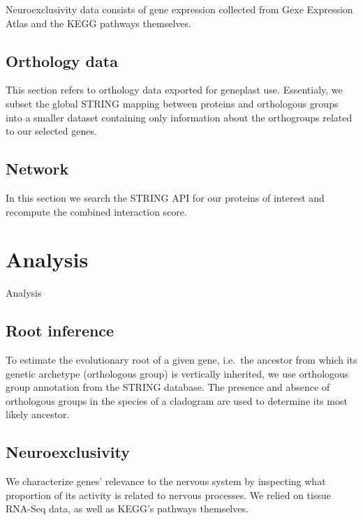 \documentclass[
]{article}
\begin{document}
Neuroexclusivity data consists of gene expression collected from Gexe
Expression Atlas and the KEGG pathways themselves.


\hypertarget{orthology-data}{%
\subsection{Orthology data}\label{orthology-data}}

This section refers to orthology data exported for geneplast use.
Essentialy, we subset the global STRING mapping between proteins and
orthologous groups into a smaller dataset containing only information
about the orthogroups related to our selected genes.


\hypertarget{network}{%
\subsection{Network}\label{network}}

In this section we search the STRING API for our proteins of interest
and recompute the combined interaction score.


\hypertarget{analysis}{%
\section{Analysis}\label{analysis}}

Analysis

\hypertarget{root-inference}{%
\subsection{Root inference}\label{root-inference}}

To estimate the evolutionary root of a given gene, i.e.~the ancestor
from which its genetic archetype (orthologous group) is vertically
inherited, we use orthologous group annotation from the STRING database.
The presence and absence of orthologous groups in the species of a
cladogram are used to determine its most likely ancestor.


\hypertarget{neuroexclusivity-1}{%
\subsection{Neuroexclusivity}\label{neuroexclusivity-1}}

We characterize genes' relevance to the nervous system by inspecting
what proportion of its activity is related to nervous processes. We
relied on tissue RNA-Seq data, as well as KEGG's pathways themselves.

\end{document}
